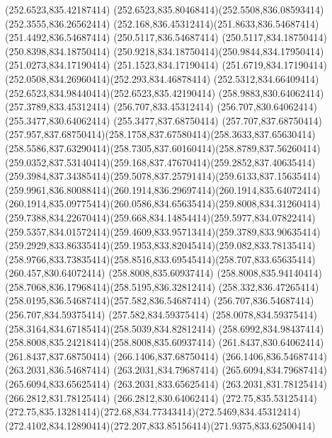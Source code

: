 {{	\closepath
	\moveto(252.6523,835.42187414)
	\curveto(252.6523,835.80468414)(252.5508,836.08593414)(252.3555,836.26562414)
	\curveto(252.168,836.45312414)(251.8633,836.54687414)(251.4492,836.54687414)
	\lineto(250.5117,836.54687414)
	\lineto(250.5117,834.18750414)
	\lineto(250.8398,834.18750414)
	\curveto(250.9218,834.18750414)(250.9844,834.17950414)(251.0273,834.17190414)
	\lineto(251.1523,834.17190414)
	\curveto(251.6719,834.17190414)(252.0508,834.26960414)(252.293,834.46878414)
	\curveto(252.5312,834.66409414)(252.6523,834.98440414)(252.6523,835.42190414)
	\closepath
	\moveto(258.9883,830.64062414)
	\lineto(257.3789,833.45312414)
	\lineto(256.707,833.45312414)
	\lineto(256.707,830.64062414)
	\lineto(255.3477,830.64062414)
	\lineto(255.3477,837.68750414)
	\lineto(257.707,837.68750414)
	\curveto(257.957,837.68750414)(258.1758,837.67580414)(258.3633,837.65630414)
	\curveto(258.5586,837.63290414)(258.7305,837.60160414)(258.8789,837.56260414)
	\curveto(259.0352,837.53140414)(259.168,837.47670414)(259.2852,837.40635414)
	\curveto(259.3984,837.34385414)(259.5078,837.25791414)(259.6133,837.15635414)
	\curveto(259.9961,836.80088414)(260.1914,836.29697414)(260.1914,835.64072414)
	\curveto(260.1914,835.09775414)(260.0586,834.65635414)(259.8008,834.31260414)
	\curveto(259.7388,834.22670414)(259.668,834.14854414)(259.5977,834.07822414)
	\curveto(259.5357,834.01572414)(259.4609,833.95713414)(259.3789,833.90635414)
	\curveto(259.2929,833.86335414)(259.1953,833.82045414)(259.082,833.78135414)
	\curveto(258.9766,833.73835414)(258.8516,833.69545414)(258.707,833.65635414)
	\lineto(260.457,830.64072414)
	\closepath
	\moveto(258.8008,835.60937414)
	\curveto(258.8008,835.94140414)(258.7068,836.17968414)(258.5195,836.32812414)
	\curveto(258.332,836.47265414)(258.0195,836.54687414)(257.582,836.54687414)
	\lineto(256.707,836.54687414)
	\lineto(256.707,834.59375414)
	\lineto(257.582,834.59375414)
	\curveto(258.0078,834.59375414)(258.3164,834.67185414)(258.5039,834.82812414)
	\curveto(258.6992,834.98437414)(258.8008,835.24218414)(258.8008,835.60937414)
	\closepath
	\moveto(261.8437,830.64062414)
	\lineto(261.8437,837.68750414)
	\lineto(266.1406,837.68750414)
	\lineto(266.1406,836.54687414)
	\lineto(263.2031,836.54687414)
	\lineto(263.2031,834.79687414)
	\lineto(265.6094,834.79687414)
	\lineto(265.6094,833.65625414)
	\lineto(263.2031,833.65625414)
	\lineto(263.2031,831.78125414)
	\lineto(266.2812,831.78125414)
	\lineto(266.2812,830.64062414)
	\closepath
	\moveto(272.75,835.53125414)
	\curveto(272.75,835.13281414)(272.68,834.77343414)(272.5469,834.45312414)
	\curveto(272.4102,834.12890414)(272.207,833.85156414)(271.9375,833.62500414)
}}
